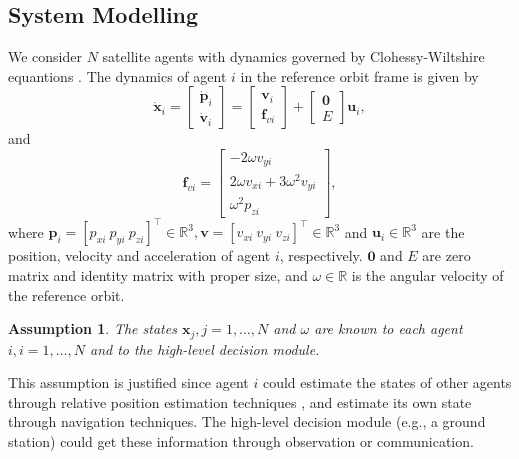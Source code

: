 \documentclass{ifacconf}
\newtheorem{assumption}[asmp]{Assumption}
\begin{document}
\subsection{System Modelling}
\par We consider $N$ satellite agents with dynamics governed by Clohessy-Wiltshire equantions \cite[]{CWequations}.
The dynamics of agent $i$ in the reference orbit frame is given by
\begin{equation} \label{eqn:dynamics1}
   \dot{\boldsymbol{x}}_i = 
      \begin{bmatrix}
         \dot{\boldsymbol{p}}_i \\ \dot{\boldsymbol{v}}_i
      \end{bmatrix} = 
      \begin{bmatrix}
         \boldsymbol{v}_i \\ \boldsymbol{f}_{vi}
      \end{bmatrix} + 
      \begin{bmatrix}
         \boldsymbol{0} \\ E
      \end{bmatrix} \boldsymbol{u}_i,
\end{equation}
and
\begin{equation} \label{eqn:dynamics2}
   \boldsymbol{f}_{vi} = 
      \begin{bmatrix}
         -2 \omega v_{yi} \\
         2\omega v_{xi} + 3\omega^2 v_{yi} \\
         \omega^2 p_{zi}
      \end{bmatrix},
\end{equation}
where $\boldsymbol{p}_i = [p_{xi}~p_{yi}~p_{zi}]^{\top} \in \mathbb{R}^3, \boldsymbol{v} = [v_{xi}~v_{yi}~v_{zi}]^\top \in \mathbb{R}^3$ and $\boldsymbol{u}_i \in \mathbb{R}^3$ are the position, velocity and acceleration of agent $i$, respectively.
$\boldsymbol{0}$ and $E$ are zero matrix and identity matrix with proper size, and $\omega \in \mathbb{R}$ is the angular velocity of the reference orbit.

\begin{assumption}
The states $\boldsymbol{x}_j, j = 1, \dots, N$ and $\omega$ are known to each agent $i, i = 1, \dots, N$ and to the high-level decision module.
\end{assumption}
\par This assumption is justified since agent $i$ could estimate the states of other agents through relative position estimation techniques \cite[]{Park2024PoseEstimation}, and estimate its own state through navigation techniques.
The high-level decision module (e.g., a ground station) could get these information through observation \cite[]{Pirovano2024detection} or communication.
\end{document}
